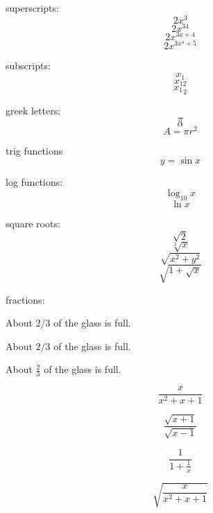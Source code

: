 \documentclass[11pt]{article}
\begin{document}
superscripts: $$2x^3$$
$$2x^{34}$$
$$2x^{3x+4}$$
$$2x^{3x^4+5}$$

subscripts:
$$x_1$$
$$x_{12}$$
$${x_1}_2$$

greek letters:
$$\pi$$
$$\alpha$$
$$A=\pi r^2$$

trig functions
$$y=\sin{x}$$

log functions:
$$\log_{10}{x}$$
$$\ln{x}$$

square roots:
$$\sqrt{2}$$
$$\sqrt[3]{x}$$
$$\sqrt{x^2+y^2}$$
$$\sqrt{1+\sqrt{x}}$$

fractions:

About 2/3 of the glass is full.

About $2/3$ of the glass is full.

About $\displaystyle{\frac{2}{3}}$ of the glass is full.

$$\frac{x}{x^2+x+1}$$

$$\frac{\sqrt{x+1}}{\sqrt{x-1}}$$

$$\frac{1}{1+\frac{1}{x}}$$

$$\sqrt{\frac{x}{x^2+x+1}}$$
\end{document}
